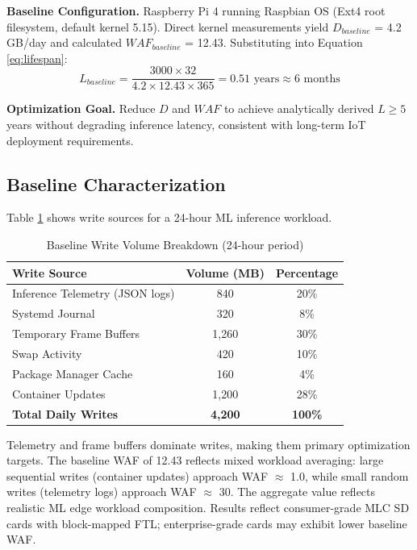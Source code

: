 \documentclass[conference]{IEEEtran}
\begin{document}
\textbf{Baseline Configuration.} Raspberry Pi 4 running Raspbian OS (Ext4 root filesystem, default kernel 5.15). Direct kernel measurements yield $D_{baseline}$ = 4.2 GB/day and calculated $WAF_{baseline}$ = 12.43. Substituting into Equation \ref{eq:lifespan}:
\begin{equation}
L_{baseline} = \frac{3000 \times 32}{4.2 \times 12.43 \times 365} = 0.51 \text{ years} \approx 6 \text{ months}
\end{equation}

\textbf{Optimization Goal.} Reduce $D$ and $WAF$ to achieve analytically derived $L \geq 5$ years without degrading inference latency, consistent with long-term IoT deployment requirements.

\subsection{Baseline Characterization}

Table \ref{tab:baseline} shows write sources for a 24-hour ML inference workload.

\begin{table}[h]
\caption{Baseline Write Volume Breakdown (24-hour period)}
\begin{center}
\begin{tabular}{lcc}
\toprule
\textbf{Write Source} & \textbf{Volume (MB)} & \textbf{Percentage} \\
\midrule
Inference Telemetry (JSON logs) & 840 & 20\% \\
Systemd Journal & 320 & 8\% \\
Temporary Frame Buffers & 1,260 & 30\% \\
Swap Activity & 420 & 10\% \\
Package Manager Cache & 160 & 4\% \\
Container Updates & 1,200 & 28\% \\
\bottomrule
\textbf{Total Daily Writes} & \textbf{4,200} & \textbf{100\%} \\
\end{tabular}
\end{center}
\label{tab:baseline}
\end{table}

Telemetry and frame buffers dominate writes, making them primary optimization targets. The baseline WAF of 12.43 reflects mixed workload averaging: large sequential writes (container updates) approach WAF $\approx$ 1.0, while small random writes (telemetry logs) approach WAF $\approx$ 30. The aggregate value reflects realistic ML edge workload composition. Results reflect consumer-grade MLC SD cards with block-mapped FTL; enterprise-grade cards may exhibit lower baseline WAF.
\end{document}
